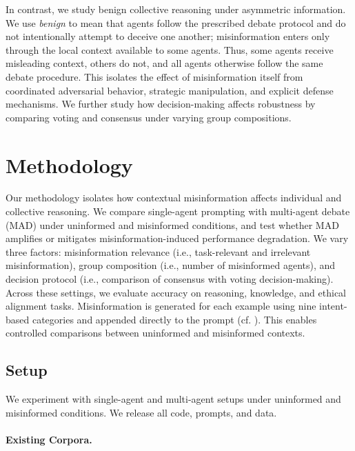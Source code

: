 \documentclass[11pt]{article}
\begin{document}
In contrast, we study benign collective reasoning under asymmetric information. 
We use \textit{benign} to mean that agents follow the prescribed debate protocol and do not intentionally attempt to deceive one another; misinformation enters only through the local context available to some agents. 
Thus, some agents receive misleading context, others do not, and all agents otherwise follow the same debate procedure. 
This isolates the effect of misinformation itself from coordinated adversarial behavior, strategic manipulation, and explicit defense mechanisms. 
We further study how decision-making affects robustness by comparing voting and consensus under varying group compositions.







\section{Methodology}

Our methodology isolates how contextual misinformation affects individual and collective reasoning. 
We compare single-agent prompting with multi-agent debate (MAD) under uninformed and misinformed conditions, and test whether MAD amplifies or mitigates misinformation-induced performance degradation.
We vary three factors: misinformation relevance (i.e., task-relevant and irrelevant misinformation), group composition (i.e., number of misinformed agents), and decision protocol (i.e., comparison of consensus with voting decision-making). 
Across these settings, we evaluate accuracy on reasoning, knowledge, and ethical alignment tasks.
Misinformation is generated for each example using nine intent-based categories and appended directly to the prompt (cf. ). 
This enables controlled comparisons between uninformed and misinformed contexts.

\subsection{Setup} \label{sec:setup}

We experiment with single-agent and multi-agent setups under uninformed and misinformed conditions. 
We release all code, prompts, and data.



\paragraph{Existing Corpora.} \label{sec:datasets}
\end{document}
